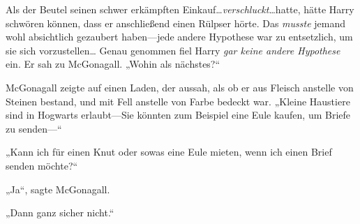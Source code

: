 Als der Beutel seinen schwer erkämpften Einkauf…\emph{verschluckt}…hatte, hätte Harry schwören können, dass er anschließend einen Rülpser hörte. Das \emph{musste} jemand wohl absichtlich gezaubert haben—jede andere Hypothese war zu entsetzlich, um sie sich vorzustellen… Genau genommen fiel Harry \emph{gar keine andere Hypothese} ein. Er sah zu McGonagall. „Wohin als nächstes?“

McGonagall zeigte auf einen Laden, der aussah, als ob er aus Fleisch anstelle von Steinen bestand, und mit Fell anstelle von Farbe bedeckt war. „Kleine Haustiere sind in Hogwarts erlaubt—Sie könnten zum Beispiel eine Eule kaufen, um Briefe zu senden—“

„Kann ich für einen Knut oder sowas eine Eule mieten, wenn ich einen Brief senden möchte?“

„Ja“, sagte McGonagall.

„Dann ganz sicher nicht.“

